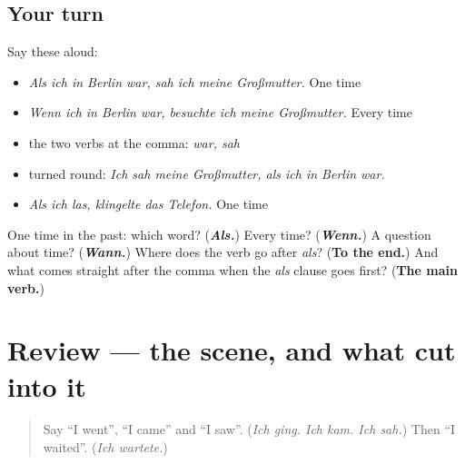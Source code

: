 \subsection*{Your turn}
Say these aloud:

\begin{itemize}
\raggedright
  \item \emph{Als ich in Berlin war, sah ich meine Großmutter.} One time
  \item \emph{Wenn ich in Berlin war, besuchte ich meine Großmutter.} Every time
  \item the two verbs at the comma: \emph{war, sah}
  \item turned round: \emph{Ich sah meine Großmutter, als ich in Berlin war.}
  \item \emph{Als ich las, klingelte das Telefon.} One time
\end{itemize}

\begin{tcolorbox}[breakable,colback=teal!4,colframe=teal!35!black,title={Before you move on}]
One time in the past: which word? (\emph{\textbf{Als.}}) Every time? (\emph{\textbf{Wenn.}}) A question about time? (\emph{\textbf{Wann.}}) Where does the verb go after \emph{als}? (\textbf{To the end.}) And what comes straight after the comma when the \emph{als} clause goes first? (\textbf{The main verb.})
\end{tcolorbox}
\section[(review)]{Review — the scene, and what cut into it}

\label{lesson:GE-C252-review}



\begin{quote}
Say \textquotedblleft{}I went\textquotedblright{}, \textquotedblleft{}I came\textquotedblright{} and \textquotedblleft{}I saw\textquotedblright{}. (\emph{Ich ging. Ich kam. Ich sah.}) Then \textquotedblleft{}I waited\textquotedblright{}. (\emph{Ich wartete.})
\end{quote}

